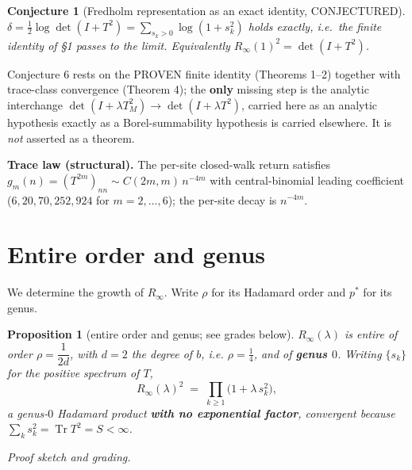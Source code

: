 \documentclass[
]{article}
\theoremstyle{plain}
\newtheorem{proposition}[theorem]{Proposition}
\newtheorem{conjecture}[theorem]{Conjecture}
\theoremstyle{remark}
\begin{document}
\begin{conjecture}[Fredholm representation as an exact identity, CONJECTURED]

\(\delta=\tfrac12\log\det(I+T^2)=\sum_{s_k>0}\log(1+s_k^2)\) holds
exactly, i.e.~the finite identity of §1 passes to the limit.
Equivalently \(R_\infty(1)^2=\det(I+T^2)\).

\end{conjecture}

Conjecture 6 rests on the PROVEN finite identity (Theorems 1--2)
together with trace-class convergence (Theorem 4); the \textbf{only}
missing step is the analytic interchange
\(\det(I+\lambda T_M^2)\to\det(I+\lambda T^2)\), carried here as an
analytic hypothesis exactly as a Borel-summability hypothesis is carried
elsewhere. It is \emph{not} asserted as a theorem.

\textbf{Trace law (structural).} The per-site closed-walk return
satisfies \(g_m(n)=(T^{2m})_{nn}\sim C(2m,m)\,n^{-4m}\) with
central-binomial leading coefficient (\(6,20,70,252,924\) for
\(m=2,\dots,6\)); the per-site decay is \(n^{-4m}\).

\section{Entire order and genus}\label{entire-order-and-genus}

We determine the growth of \(R_\infty\). Write \(\rho\) for its Hadamard
order and \(p^{*}\) for its genus.

\begin{proposition}[entire order and genus; see grades below]

\(R_\infty(\lambda)\) is entire of order \(\rho=\dfrac1{2d}\), with
\(d=2\) the degree of \(b\), i.e. \(\rho=\tfrac14\), and of
\textbf{genus \(0\)}. Writing \(\{s_k\}\) for the positive spectrum of
\(T\), \[
R_\infty(\lambda)^2 \;=\; \prod_{k\ge1}\bigl(1+\lambda\,s_k^2\bigr),
\] a genus-\(0\) Hadamard product \textbf{with no exponential factor},
convergent because \(\sum_k s_k^2=\operatorname{Tr}T^2=S<\infty\).

\end{proposition}

\emph{Proof sketch and grading.}
\end{document}
